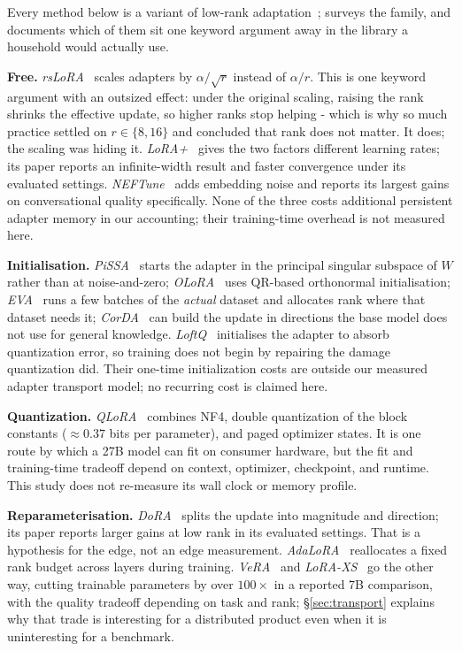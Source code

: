 \documentclass[conference]{IEEEtran}
\begin{document}
Every method below is a variant of low-rank adaptation~\cite{hu2021lora};
\cite{lorasurvey2024} surveys the family, and \cite{peft_library2026}
documents which of them sit one keyword argument away in the library a
household would actually use.

\textbf{Free.} \emph{rsLoRA}~\cite{kalajdzievski2023rslora} scales adapters by
$\alpha/\sqrt{r}$ instead of $\alpha/r$. This is one keyword argument with an
outsized effect: under the original scaling, raising the rank shrinks the
effective update, so higher ranks stop helping - which is why so much practice
settled on $r \in \{8,16\}$ and concluded that rank does not matter. It does;
the scaling was hiding it. \emph{LoRA+}~\cite{hayou2024loraplus} gives the two
factors different learning rates; its paper reports an infinite-width result
and faster convergence under its evaluated settings.
\emph{NEFTune}~\cite{jain2023neftune} adds embedding noise and reports its
largest gains on conversational quality specifically. None of the three costs
additional persistent adapter memory in our accounting; their training-time
overhead is not measured here.

\textbf{Initialisation.} \emph{PiSSA}~\cite{meng2024pissa} starts the adapter in
the principal singular subspace of $W$ rather than at noise-and-zero;
\emph{OLoRA}~\cite{buyukakyuz2024olora} uses QR-based orthonormal
initialisation; \emph{EVA}~\cite{paischer2024eva} runs a few batches of the
\emph{actual} dataset and allocates rank where that dataset needs it;
\emph{CorDA}~\cite{yang2024corda} can build the update in directions the base
model does not use for general knowledge. \emph{LoftQ}~\cite{li2023loftq}
initialises the adapter to absorb quantization error, so training does not begin
by repairing the damage quantization did. Their one-time initialization costs
are outside our measured adapter transport model; no recurring cost is claimed
here.

\textbf{Quantization.} \emph{QLoRA}~\cite{dettmers2023qlora} combines NF4,
double quantization of the block constants ($\approx 0.37$ bits per parameter),
and paged optimizer states. It is one route by which a 27B model can fit on
consumer hardware, but the fit and training-time tradeoff depend on context,
optimizer, checkpoint, and runtime. This study does not re-measure its wall
clock or memory profile.

\textbf{Reparameterisation.} \emph{DoRA}~\cite{liu2024dora} splits the update
into magnitude and direction; its paper reports larger gains at low rank in its
evaluated settings. That is a hypothesis for the edge, not an edge measurement.
\emph{AdaLoRA}~\cite{zhang2023adalora} reallocates a fixed rank budget across
layers during training. \emph{VeRA}~\cite{kopiczko2023vera} and
\emph{LoRA-XS}~\cite{balazy2024loraxs} go the other way, cutting trainable
parameters by over $100\times$ in a reported 7B comparison, with the quality
tradeoff depending on task and rank; \S\ref{sec:transport}
explains why that trade is interesting for a distributed product even when it is
uninteresting for a benchmark.
\end{document}
